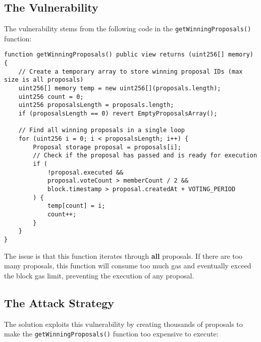 \documentclass[12pt]{article}
\begin{document}
\subsection*{The Vulnerability}

The vulnerability stems from the following code in the \texttt{getWinningProposals()} function:

\noindent
\begin{minipage}{\textwidth}
\begin{lstlisting}[language=Solidity]
function getWinningProposals() public view returns (uint256[] memory) {
    // Create a temporary array to store winning proposal IDs (max size is all proposals)
    uint256[] memory temp = new uint256[](proposals.length);
    uint256 count = 0;
    uint256 proposalsLength = proposals.length;
    if (proposalsLength == 0) revert EmptyProposalsArray();

    // Find all winning proposals in a single loop
    for (uint256 i = 0; i < proposalsLength; i++) {
        Proposal storage proposal = proposals[i];
        // Check if the proposal has passed and is ready for execution
        if (
            !proposal.executed &&
            proposal.voteCount > memberCount / 2 &&
            block.timestamp > proposal.createdAt + VOTING_PERIOD
        ) {
            temp[count] = i;
            count++;
        }
    }
}
\end{lstlisting}
\end{minipage}

The issue is that this function iterates through \textbf{all} proposals. If there are too many proposals, this function will consume too much gas and eventually exceed the block gas limit, preventing the execution of any proposal.

\subsection*{The Attack Strategy}

The solution exploits this vulnerability by creating thousands of proposals to make the \texttt{getWinningProposals()} function too expensive to execute:
\end{document}
